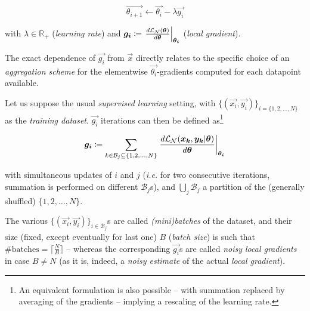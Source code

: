 \begin{equation} \label{eq:1}
    \vec{\theta_{i+1}} \leftarrow  \vec{\theta_{i}} - \lambda\vec{g_i}
\end{equation}

with $\lambda \in \mathbb{R}_+$ (\textit{learning rate}) and $\bm{g_i} \coloneqq \left.\frac{\mathop{d\mathcal{L}_{\mathcal{N}}(\bm{\theta})}}{\mathop{d\bm{\theta}}} \right|_{\bm{\theta_{i}}}$ (\textit{local gradient}).

The exact dependence of $\vec{g_i}$ from $\vec{x}$ directly relates to the specific choice of an \textit{aggregation scheme} for the elementwise $\vec{\theta_{i}}$-gradients computed for each datapoint available.

Let us suppose the usual \textit{supervised learning} setting, with $\{(\vec{x_i}, \vec{y_i})\}_{i = \{1,2,\dots,N\}}$ as the \textit{training dataset}. $\vec{g_i}$ iterations can then be defined as\footnote{An equivalent formulation is also possible -- with summation replaced by averaging of the gradients -- implying a rescaling of the learning rate.}

$$\bm{g_i} \coloneqq \sum_{k \in \mathcal{B}_j \subseteq \{1,2,\dots,N\}}{\left.\frac{\mathop{d\mathcal{L}_{\mathcal{N}}(\bm{x_k}, \bm{y_k}|\bm{\theta})}}{\mathop{d\bm{\theta}}} \right|_{\bm{\theta_{i}}}}$$

with simultaneous updates of $i$ and $j$ (\textit{i.e.} for two consecutive iterations, summation is performed on different $\mathcal{B}_j$s), and $\bigcup_j\mathcal{B}_j$ a partition of the (generally shuffled) $\{1,2,\dots,N\}$.

The various $\{(\vec{x_i}, \vec{y_i})\}_{i \in \mathcal{B}_j}$s are called \textit{(mini)batches} of the dataset, and their size (fixed, except eventually for last one) $B$ (\textit{batch size}) is such that $\#\text{batches} = \lceil \frac{N}{B}\rceil$ -- whereas the corresponding $\vec{g_i}$s are called \textit{noisy local gradients} in case $B \neq N$ (as it is, indeed, a \textit{noisy estimate} of the actual \textit{local gradient}).

